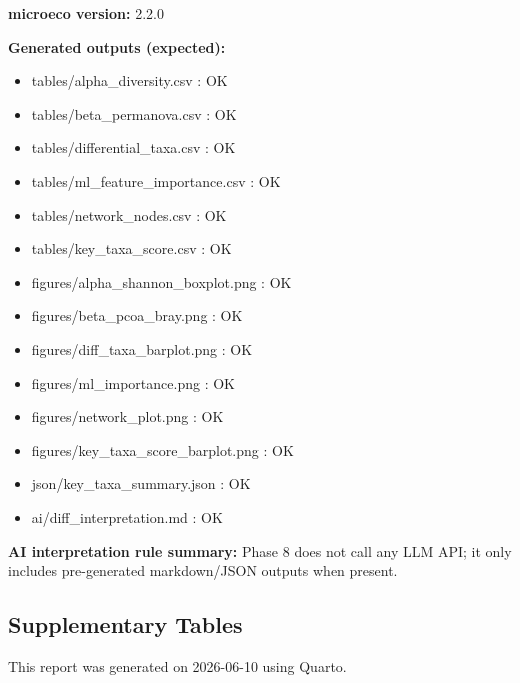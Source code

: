 \documentclass[
  letterpaper,
  DIV=11,
  numbers=noendperiod]{scrartcl}
\providecommand{\tightlist}{%
  \setlength{\itemsep}{0pt}\setlength{\parskip}{0pt}}
\begin{document}
\textbf{microeco version:} 2.2.0

\textbf{Generated outputs (expected):}

\begin{itemize}
\tightlist
\item
  tables/alpha\_diversity.csv : OK
\item
  tables/beta\_permanova.csv : OK
\item
  tables/differential\_taxa.csv : OK
\item
  tables/ml\_feature\_importance.csv : OK
\item
  tables/network\_nodes.csv : OK
\item
  tables/key\_taxa\_score.csv : OK
\item
  figures/alpha\_shannon\_boxplot.png : OK
\item
  figures/beta\_pcoa\_bray.png : OK
\item
  figures/diff\_taxa\_barplot.png : OK
\item
  figures/ml\_importance.png : OK
\item
  figures/network\_plot.png : OK
\item
  figures/key\_taxa\_score\_barplot.png : OK
\item
  json/key\_taxa\_summary.json : OK
\item
  ai/diff\_interpretation.md : OK
\end{itemize}

\textbf{AI interpretation rule summary:} Phase 8 does not call any LLM
API; it only includes pre-generated markdown/JSON outputs when present.

\subsection{Supplementary Tables}\label{supplementary-tables}

This report was generated on 2026-06-10 using Quarto.
\end{document}

